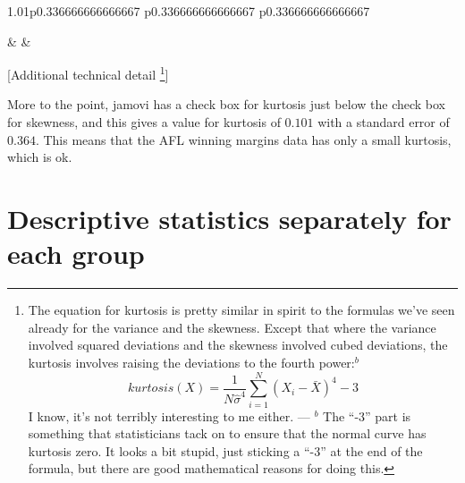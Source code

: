 \documentclass[
]{book}
\begin{document}
\begin{table}[ht]
\begin{centerbox}
\begin{threeparttable}
\begin{tabularx}{1.01\textwidth}{p{} p{} p{}}
\hhline{}

 &
 &
 \tabularnewline[-0.5pt]


\end{tabularx}\captionsetup{justification=raggedright,singlelinecheck=off}
\caption{\label{tab:tab4-4} Thin to fat tails to illustrate kurtosis}
 
\end{threeparttable}\par\end{centerbox}

\end{table}
 

{{[}Additional technical detail \footnote{The equation for kurtosis is pretty similar in spirit to the formulas we've seen already for the variance and the skewness. Except that where the variance involved squared deviations and the skewness involved cubed deviations, the kurtosis involves raising the deviations to the fourth power:\(^b\) \[kurtosis(X)=\frac{1}{N \hat{\sigma}^4} \sum_{i=1}^{N} ( X_i - \bar{X} )^4 - 3\] I know, it's not terribly interesting to me either. --- \(^b\) The ``-3'' part is something that statisticians tack on to ensure that the normal curve has kurtosis zero. It looks a bit stupid, just sticking a ``-3'' at the end of the formula, but there are good mathematical reasons for doing this.}{]}}

More to the point, jamovi has a check box for kurtosis just below the check box for skewness, and this gives a value for kurtosis of \(0.101\) with a standard error of \(0.364\). This means that the AFL winning margins data has only a small kurtosis, which is ok.

\hypertarget{descriptive-statistics-separately-for-each-group}{%
\section{Descriptive statistics separately for each group}\label{descriptive-statistics-separately-for-each-group}}
\end{document}
